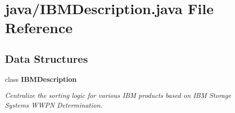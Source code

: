 \section{java/\+I\+B\+M\+Description.java File Reference}
\label{IBMDescription_8java}
\subsection*{Data Structures}
\begin{DoxyCompactItemize}
\item 
class {\bf I\+B\+M\+Description}
\begin{DoxyCompactList}\small\item\em Centralize the sorting logic for various I\+B\+M products based on I\+B\+M Storage Systems W\+W\+P\+N Determination. \end{DoxyCompactList}\end{DoxyCompactItemize}
